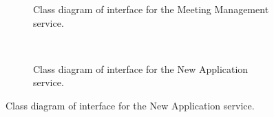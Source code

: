 \documentclass[12pt]{article}
\begin{document}
\begin{figure}[H]
\begin{subfigure}[H]{0.47\textwidth}
\centering	
{}
\caption{Class diagram of interface for the Meeting Management service.}
\end{subfigure}
~
\begin{subfigure}[H]{0.47\textwidth}
\centering	
{}
\caption{Class diagram of interface for the New Application service.}
\end{subfigure}


\end{figure}
\end{document}
